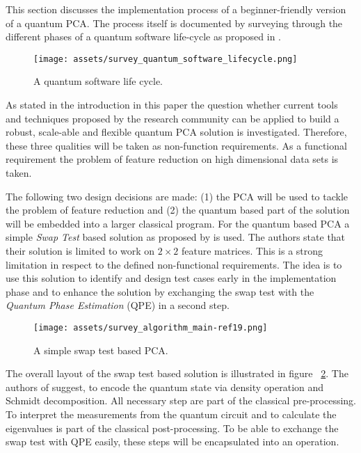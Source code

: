 \noindent
This section discusses the implementation process of a beginner-friendly version of a quantum PCA. The process itself is documented by surveying through the different phases of a quantum software life-cycle as proposed in \cite{Zhao_2020}.

\begin{figure}
  \centering
  \texttt{[image: assets/survey\_quantum\_software\_lifecycle.png]}
  \caption{A quantum software life cycle. \cite{Zhao_2020}}
  \label{fig:lifecycle}
\end{figure}

As stated in the introduction in this paper the question whether current tools and techniques proposed by the research community can be applied to build a robust, scale-able and flexible quantum PCA solution is investigated. Therefore, these three qualities will be taken as non-function requirements. As a functional requirement the problem of feature reduction on high dimensional data sets is taken.

The following two design decisions are made: (1) the PCA will be used to tackle the problem of feature reduction and (2) the quantum based part of the solution will be embedded into a larger classical program. For the quantum based PCA a simple \emph{Swap Test} based solution as proposed by \cite{Lokho_2020} is used. The authors state that their solution is limited to work on $2 \times 2$ feature matrices. This is a strong limitation in respect to the defined non-functional requirements. The idea is to use this solution to identify and design test cases early in the implementation phase and to enhance the solution by exchanging the swap test with the \emph{Quantum Phase Estimation} (QPE) in a second step.

\begin{figure}
  \centering
  \texttt{[image: assets/survey\_algorithm\_main-ref19.png]}
  \caption{A simple swap test based PCA. \cite{Lokho_2020}}
  \label{fig:mainref19}
\end{figure}

The overall layout of the swap test based solution is illustrated in figure ~\ref{fig:mainref19}. The authors of \cite{Lokho_2020} suggest, to encode the quantum state via density operation and Schmidt decomposition. All necessary step are part of the classical pre-processing. To interpret the measurements from the quantum circuit and to calculate the eigenvalues is part of the classical post-processing. To be able to exchange the swap test with QPE easily, these steps will be encapsulated into an operation.

